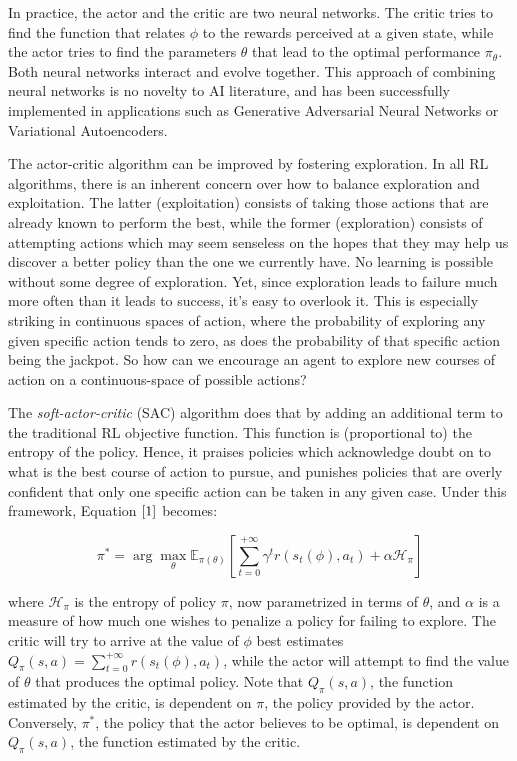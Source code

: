 \documentclass{article}
\begin{document}
In practice, the actor and the critic are two neural networks. The critic tries to find the function that relates $\phi$ to the rewards perceived at a given state, while the actor tries to find the parameters $\theta$ that lead to the optimal performance $\pi_\theta$. Both neural networks interact and evolve together. This approach of combining neural networks is no novelty to AI literature, and has been successfully implemented in applications such as Generative Adversarial Neural Networks or Variational Autoencoders.

The actor-critic algorithm can be improved by fostering exploration. In all RL algorithms, there is an inherent concern over how to balance exploration and exploitation. The latter (exploitation) consists of taking those actions that are already known to perform the best, while the former (exploration) consists of attempting actions which may seem senseless on the hopes that they may help us discover a better policy than the one we currently have. No learning is possible without some degree of exploration. Yet, since exploration leads to failure much more often than it leads to success, it's easy to overlook it. This is especially striking in continuous spaces of action, where the probability of exploring any given specific action tends to zero, as does the probability of that specific action being the jackpot. So how can we encourage an agent to explore new courses of action on a continuous-space of possible actions?

The \emph{soft-actor-critic} (SAC) algorithm does that by adding an additional term to the traditional RL objective function. This function is (proportional to) the entropy of the policy. Hence, it praises policies which acknowledge doubt on to what is the best course of action to pursue, and punishes policies that are overly confident that only one specific action can be taken in any  given case. Under this framework, Equation $\ref{1}$ becomes:

$$
\pi^*=\arg \max_{\theta} \mathbb{E}_{\pi(\theta)} \left[ \sum_{t=0}^{+\infty} \gamma^t r(s_t(\phi),a_t) + \alpha \mathcal{H_\pi}\right ] \label{2}
$$

where $\mathcal{H_\pi}$ is the entropy of policy $\pi$, now parametrized in terms of $\theta$, and $\alpha$ is a measure of how much one wishes to penalize a policy for failing to explore. The critic will try to arrive at the value of $\phi$ best estimates  $Q_\pi(s,a)=\sum_{t=0}^{+\infty}r(s_t(\phi),a_t)$, while the actor will attempt to find the value of $\theta$ that produces the optimal policy. Note that $Q_\pi(s,a)$, the function estimated by the critic, is dependent on $\pi$, the policy provided by the actor. Conversely,  $\pi^*$, the policy that the actor believes to be optimal, is dependent on $Q_\pi(s,a)$, the function estimated by the critic.
\end{document}
